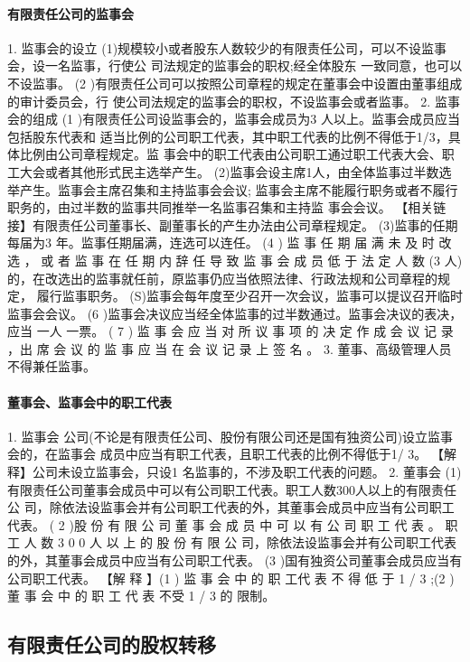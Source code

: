 \documentclass[UTF8,12pt]{ctexart}
\numberwithin{equation}{section} %
\numberwithin{figure}{section}
\numberwithin{table}{section}
\begin{document}
	\paragraph{有限责任公司的监事会}
	1. 监事会的设立 (1)规模较小或者股东人数较少的有限责任公司，可以不设监事会，设一名监事，行使公 司法规定的监事会的职权;经全体股东 一致同意，也可以不设监事。
	(2 )有限责任公司可以按照公司章程的规定在董事会中设置由董事组成的审计委员会，行 使公司法规定的监事会的职权，不设监事会或者监事。
	2. 监事会的组成
	(1 )有限责任公司设监事会的，监事会成员为3 人以上。监事会成员应当包括股东代表和 适当比例的公司职工代表，其中职工代表的比例不得低于1/3，具体比例由公司章程规定。监 事会中的职工代表由公司职工通过职工代表大会、职工大会或者其他形式民主选举产生。 (2)监事会设主席1人，由全体监事过半数选举产生。监事会主席召集和主持监事会会议; 监事会主席不能履行职务或者不履行职务的，由过半数的监事共同推举一名监事召集和主持监 事会会议。
	【相关链接】有限责任公司董事长、副董事长的产生办法由公司章程规定。
	(3)监事的任期每届为3 年。监事任期届满，连选可以连任。
	(4 ) 监 事 任 期 届 满 未 及 时 改 选 ， 或 者 监 事 在 任 期 内 辞 任 导 致 监 事 会 成 员 低 于 法 定 人 数 (3 人)的，在改选出的监事就任前，原监事仍应当依照法律、行政法规和公司章程的规定， 履行监事职务。
	(S)监事会每年度至少召开一次会议，监事可以提议召开临时监事会会议。
	(6 )监事会决议应当经全体监事的过半数通过。监事会决议的表决，应当 一人 一票。
	( 7 ) 监 事 会 应 当 对 所 议 事 项 的 决 定 作 成 会 议 记 录 ，出 席 会 议 的 监 事 应 当 在 会 议 记 录 上 签 名 。 3. 董事、高级管理人员不得兼任监事。
	
	\paragraph{董事会、监事会中的职工代表}
	1. 监事会 公司(不论是有限责任公司、股份有限公司还是国有独资公司)设立监事会的，在监事会 成员中应当有职工代表，且职工代表的比例不得低于1/ 3。
	【解释】公司未设立监事会，只设1 名监事的，不涉及职工代表的问题。
	2. 董事会 (1)有限责任公司董事会成员中可以有公司职工代表。职工人数300人以上的有限责任公 司，除依法设监事会并有公司职工代表的外，其董事会成员中应当有公司职工代表。
	( 2 )股 份 有 限 公 司 董 事 会 成 员 中 可 以 有 公 司 职 工 代 表 。 职 工 人 数 3 0 0 人 以 上 的 股 份 有 限 公 司，除依法设监事会并有公司职工代表的外，其董事会成员中应当有公司职工代表。
	(3 )国有独资公司董事会成员应当有公司职工代表。
	【解 释 】(1 ) 监 事 会 中 的 职 工代 表 不 得 低 于 1 / 3 ;(2 ) 董 事 会 中 的 职 工 代 表 不受 1 / 3 的 限制。
	
	\subsection{有限责任公司的股权转移}
	
\end{document}
